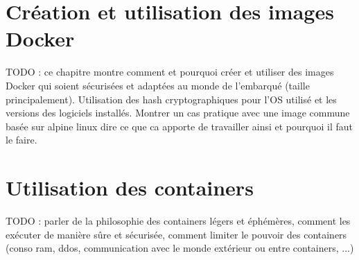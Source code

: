 \documentclass[11pt,a4paper,oneside]{report}
\begin{document}
\chapter{Création et utilisation des images Docker}\label{creation_utilisation_images_docker}
TODO : ce chapitre montre comment et pourquoi créer et utiliser des images Docker qui soient sécurisées et adaptées au monde de l'embarqué (taille principalement). Utilisation des hash cryptographiques pour l'OS utilisé et les versions des logiciels installés.
Montrer un cas pratique avec une image commune basée sur alpine linux dire ce que ca apporte de travailler ainsi et pourquoi il faut le faire.


\chapter{Utilisation des containers}\label{utilisation_containers}
TODO : parler de la philosophie des containers légers et éphémères, comment les exécuter de manière sûre et sécurisée, comment limiter le pouvoir des containers (conso ram, ddos, communication avec le monde extérieur ou entre containers, ...)
\end{document}
